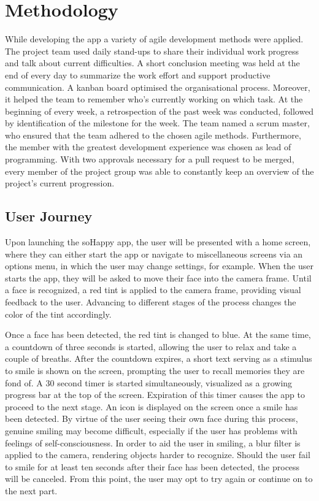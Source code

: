 \section{Methodology} \label{sec:methodology}
While developing the app a variety of agile development methods were applied.
The project team used daily stand-ups to share their individual work progress and talk about current difficulties.
A short conclusion meeting was held at the end of every day to summarize the work effort and support productive communication.
A kanban board optimised the organisational process. Moreover, it helped the team to remember who's currently working on which task.
At the beginning of every week, a retrospection of the past week was conducted, followed by identification of the milestone for the week.
The team named a scrum master, who ensured that the team adhered to the chosen agile methods. Furthermore, the member with the greatest development experience was chosen as lead of programming.
With two approvals necessary for a pull request to be merged, every member of the project group was able to constantly keep an overview of the project's current progression.

\subsection{User Journey} \label{sec:user_journey}
Upon launching the soHappy app, the user will be presented with a home screen, where they can either start the app or navigate to miscellaneous screens via an options menu, in which the user may change settings, for example.
When the user starts the app, they will be asked to move their face into the camera frame. Until a face is recognized, a red tint is applied to the camera frame, providing visual feedback to the user. Advancing to different stages of the process changes the color of the tint accordingly.

Once a face has been detected, the red tint is changed to blue. At the same time, a countdown of three seconds is started, allowing the user to relax and take a couple of breaths.
After the countdown expires, a short text serving as a stimulus to smile is shown on the screen, prompting the user to recall memories they are fond of. A 30 second timer is started simultaneously, visualized as a growing progress bar at the top of the screen. Expiration of this timer causes the app to proceed to the next stage. An icon is displayed on the screen once a smile has been detected.
By virtue of the user seeing their own face during this process, genuine smiling may become difficult, especially if the user has problems with feelings of self-consciousness. In order to aid the user in smiling, a blur filter is applied to the camera, rendering objects harder to recognize.
Should the user fail to smile for at least ten seconds after their face has been detected, the process will be canceled. From this point, the user may opt to try again or continue on to the next part.

